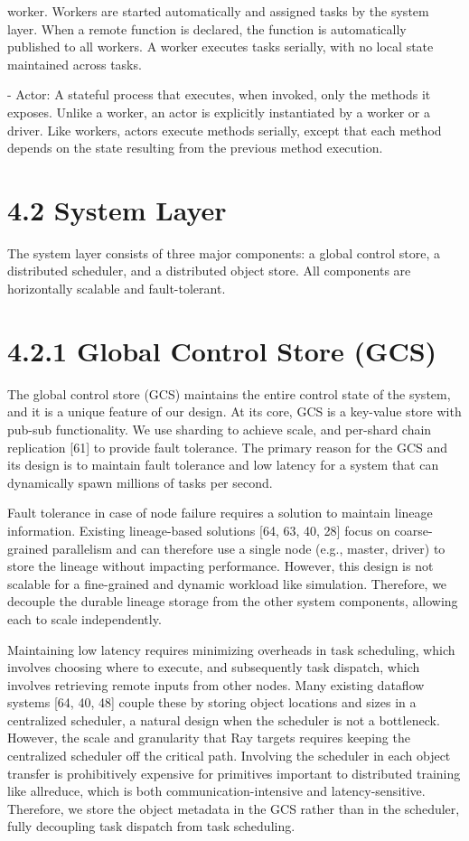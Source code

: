 \documentclass[
]{article}
\begin{document}
worker. Workers are started automatically and assigned tasks by the
system layer. When a remote function is declared, the function is
automatically published to all workers. A worker executes tasks
serially, with no local state maintained across tasks.

- Actor: A stateful process that executes, when invoked, only the
methods it exposes. Unlike a worker, an actor is explicitly instantiated
by a worker or a driver. Like workers, actors execute methods serially,
except that each method depends on the state resulting from the previous
method execution.

\section{4.2 System Layer}\label{system-layer}

The system layer consists of three major components: a global control
store, a distributed scheduler, and a distributed object store. All
components are horizontally scalable and fault-tolerant.

\section{4.2.1 Global Control Store
(GCS)}\label{global-control-store-gcs}

The global control store (GCS) maintains the entire control state of the
system, and it is a unique feature of our design. At its core, GCS is a
key-value store with pub-sub functionality. We use sharding to achieve
scale, and per-shard chain replication {[}61{]} to provide fault
tolerance. The primary reason for the GCS and its design is to maintain
fault tolerance and low latency for a system that can dynamically spawn
millions of tasks per second.

Fault tolerance in case of node failure requires a solution to maintain
lineage information. Existing lineage-based solutions {[}64, 63, 40,
28{]} focus on coarse-grained parallelism and can therefore use a single
node (e.g., master, driver) to store the lineage without impacting
performance. However, this design is not scalable for a fine-grained and
dynamic workload like simulation. Therefore, we decouple the durable
lineage storage from the other system components, allowing each to scale
independently.

Maintaining low latency requires minimizing overheads in task
scheduling, which involves choosing where to execute, and subsequently
task dispatch, which involves retrieving remote inputs from other nodes.
Many existing dataflow systems {[}64, 40, 48{]} couple these by storing
object locations and sizes in a centralized scheduler, a natural design
when the scheduler is not a bottleneck. However, the scale and
granularity that Ray targets requires keeping the centralized scheduler
off the critical path. Involving the scheduler in each object transfer
is prohibitively expensive for primitives important to distributed
training like allreduce, which is both communication-intensive and
latency-sensitive. Therefore, we store the object metadata in the GCS
rather than in the scheduler, fully decoupling task dispatch from task
scheduling.
\end{document}
